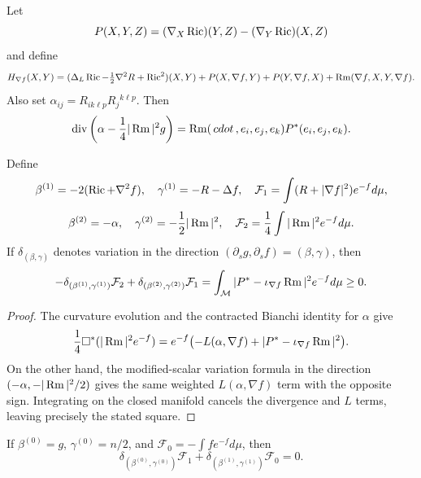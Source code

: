 \begin{definition}
\label{def:chow-iii-ch17-matrix-harnack-curvature-square}

Let
\[
 P(X,Y,Z)=(\nabla_X\operatorname{Ric})(Y,Z)-(\nabla_Y\operatorname{Ric})(X,Z)
\]
and define
\[
 H_{\nabla f}(X,Y)=
 (\Delta_L\operatorname{Ric}-\tfrac12\nabla^2R+\operatorname{Ric}^2)(X,Y)
 +P(X,\nabla f,Y)+P(Y,\nabla f,X)
 +\operatorname{Rm}(\nabla f,X,Y,\nabla f).
\]
Also set $\alpha_{ij}=R_{ik\ell p}R_j{}^{k\ell p}$.  Then
\[
 \operatorname{div}\left(\alpha-\frac14|\operatorname{Rm}|^2g\right)
 =\operatorname{Rm}(\,cdot\,,e_i,e_j,e_k)P^*(e_i,e_j,e_k).
\]
\end{definition}

\begin{theorem}
\label{thm:chow-iii-ch17-coupled-loop-variation}


Define
\[
 \beta^{(1)}=-2(\operatorname{Ric}+\nabla^2f),\quad \gamma^{(1)}=-R-\Delta f,
 \quad \mathcal F_1=\int(R+|\nabla f|^2)e^{-f}d\mu,
\]
\[
 \beta^{(2)}=-\alpha,\quad \gamma^{(2)}=-\frac12|\operatorname{Rm}|^2,
 \quad \mathcal F_2=\frac14\int|\operatorname{Rm}|^2e^{-f}d\mu.
\]
If $\delta_{(\beta,\gamma)}$ denotes variation in the direction
$(\partial_sg,\partial_sf)=(\beta,\gamma)$, then
\[
 -\delta_{(\beta^{(1)},\gamma^{(1)})}\mathcal F_2
 +\delta_{(\beta^{(2)},\gamma^{(2)})}\mathcal F_1
 =\int_{\mathcal M}|P^*-\iota_{\nabla f}\operatorname{Rm}|^2e^{-f}d\mu\ge0.
\]
\end{theorem}
\begin{proof}
\sketch The curvature evolution and the contracted Bianchi identity for $\alpha$
give
\[
 \frac14\Box^*(|\operatorname{Rm}|^2e^{-f})
 =e^{-f}\bigl(-L(\alpha,\nabla f)
 +|P^*-\iota_{\nabla f}\operatorname{Rm}|^2\bigr).
\]
On the other hand, the modified-scalar variation formula in the direction
$(-\alpha,-|\operatorname{Rm}|^2/2)$ gives the same weighted
$L(\alpha,\nabla f)$ term with the opposite sign.  Integrating on the closed
manifold cancels the divergence and $L$ terms, leaving precisely the stated
square.
\end{proof}

\begin{remark}
\label{rem:chow-iii-ch17-zeroth-loop-variation}

If $\beta^{(0)}=g$, $\gamma^{(0)}=n/2$, and
$\mathcal F_0=-\int f e^{-f}d\mu$, then
\[
 \delta_{(\beta^{(0)},\gamma^{(0)})}\mathcal F_1
 +\delta_{(\beta^{(1)},\gamma^{(1)})}\mathcal F_0=0.
\]
\end{remark}

